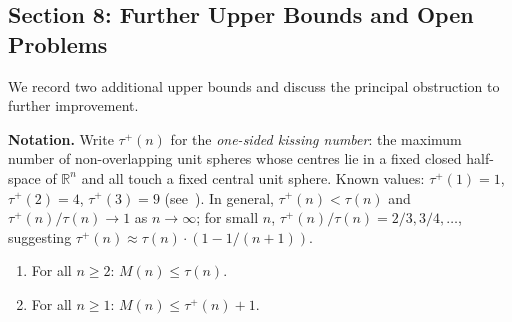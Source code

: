 \subsection*{Section 8: Further Upper Bounds and Open Problems}

We record two additional upper bounds and discuss the principal obstruction to further improvement.

\medskip
\textbf{Notation.}  Write $\tau^+(n)$ for the \emph{one-sided kissing number}: the maximum number of non-overlapping unit spheres whose centres lie in a fixed closed half-space of $\mathbb{R}^n$ and all touch a fixed central unit sphere.  Known values: $\tau^+(1)=1$, $\tau^+(2)=4$, $\tau^+(3)=9$ (see~\cite{BvM2022}).  In general, $\tau^+(n)<\tau(n)$ and $\tau^+(n)/\tau(n)\to 1$ as $n\to\infty$; for small $n$, $\tau^+(n)/\tau(n) = 2/3, 3/4, \ldots$, suggesting $\tau^+(n) \approx \tau(n)\cdot(1-1/(n+1))$.

\begin{theorem}\label{thm:further}
\begin{enumerate}
\item[\textup{(i)}] For all $n\ge 2$: $M(n)\le \tau(n)$.
\item[\textup{(ii)}] For all $n\ge 1$: $M(n)\le \tau^+(n)+1$.
\end{enumerate}
\end{theorem}

